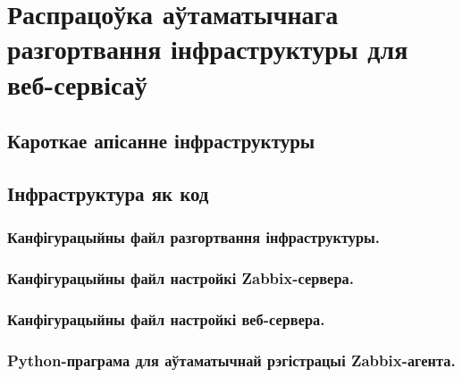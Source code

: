 \section{Распрацоўка аўтаматычнага разгортвання інфраструктуры для веб-сервісаў}

\subsection{Кароткае апісанне інфраструктуры}

\subsection{Інфраструктура як код}

\subsubsection{Канфігурацыйны файл разгортвання інфраструктуры.}


\subsubsection{Канфігурацыйны файл настройкі Zabbix-сервера.}


\subsubsection{Канфігурацыйны файл настройкі веб-сервера.}


\subsubsection{Python-праграма для аўтаматычнай рэгістрацыі Zabbix-агента.}

